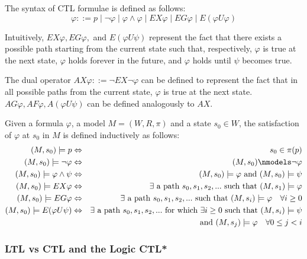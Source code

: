 \documentclass{article}
\newenvironment{definition}[1][Definition]{\begin{trivlist}
\item[\hskip \labelsep {\bfseries #1}]}{\end{trivlist}}
\begin{document}
\begin{definition} 
The syntax of CTL formulae is defined as follows: 
$$ \varphi ::= p \mid \lnot \varphi \mid \varphi \land \varphi \mid EX\varphi \mid EG\varphi \mid E(\varphi U \varphi)$$
\end{definition}

Intuitively, $ EX\varphi,  EG\varphi,$ and $ E(\varphi U \psi)$ represent the fact that there exists a possible path starting from the current state such that, respectively, $\varphi$ is true at the next state, $\varphi$ holds forever in the future, and $\varphi$ holds until $\psi$ becomes true.

The dual operator $AX\varphi ::= \lnot EX \lnot\varphi $ can be defined to represent the fact that in all possible paths from the current state, $\varphi$ is true at the next state.
$AG\varphi, AF\varphi, A(\varphi U\psi)$ can be defined analogously to $AX$. 

\begin{definition} 
Given a formula $\varphi$, a model $M = (W, R, \pi)$ and a state $s_0 \in W$, the satisfaction of $\varphi$ at $s_0$ in $M$ is defined inductively as follows: 
\begin{eqnarray*}
(M, s_0) \models p &\Leftrightarrow& s_0 \in \pi(p) \\  
(M, s_0) \models \lnot \varphi &\Leftrightarrow& (M, s_0) \nmodels \lnot \varphi\\
(M, s_0) \models \varphi \land \psi &\Leftrightarrow& (M, s_0) \models \varphi \mbox{ and  } (M, s_0) \models \psi \\
(M, s_0) \models EX\varphi &\Leftrightarrow& \exists \mbox{ a path } s_0, s_1, s_2, ... \mbox{ such that } (M, s_1) \models \varphi \\
(M, s_0) \models EG\varphi &\Leftrightarrow& \exists \mbox{ a path } s_0, s_1, s_2, ... \mbox{ such that } (M, s_i) \models \varphi \quad \forall i \geq 0\\
(M, s_0) \models E(\varphi U\psi) &\Leftrightarrow&  \exists \mbox{ a path } s_0, s_1, s_2, ... \mbox{ for which } \exists i \geq 0 \mbox{ such that }  (M, s_i) \models \psi \\ && \mbox{ and }  (M, s_j) \models \varphi \quad \forall 0 \leq j < i
\end{eqnarray*}


\end{definition}

\subsubsection{LTL vs CTL and the Logic CTL*}
\end{document}
